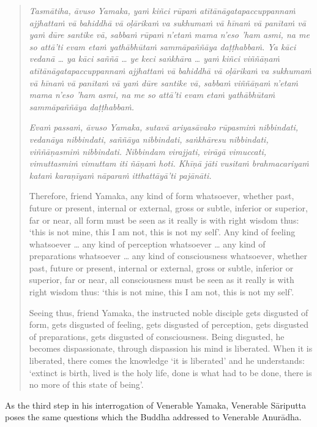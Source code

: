 \begin{quote}
\emph{Tasmātiha, āvuso Yamaka, yaṁ kiñci rūpaṁ atītānāgatapaccuppannaṁ ajjhattaṁ vā bahiddhā vā oḷārikaṁ va sukhumaṁ vā hīnaṁ vā panītaṁ vā yaṁ dūre santike vā, sabbaṁ rūpaṁ n'etaṁ mama n'eso 'ham asmi, na me so attā'ti evam etaṁ yathābhūtaṁ sammāpaññāya daṭṭhabbaṁ. Ya kāci vedanā \ldots{} ya kāci saññā \ldots{} ye keci saṅkhāra \ldots{} yaṁ kiñci viññāṇaṁ atītānāgatapaccuppannaṁ ajjhattaṁ vā bahiddhā vā oḷārikaṁ va sukhumaṁ vā hīnaṁ vā panītaṁ vā yaṁ dūre santike vā, sabbaṁ viññāṇaṁ n'etaṁ mama n'eso 'ham asmi, na me so attā'ti evam etaṁ yathābhūtaṁ sammāpaññāya daṭṭhabbaṁ.}

\emph{Evaṁ passaṁ, āvuso Yamaka, sutavā ariyasāvako rūpasmiṁ nibbindati, vedanāya nibbindati, saññāya nibbindati, saṅkhāresu nibbindati, viññāṇasmiṁ nibbindati. Nibbindam virajjati, virāgā vimuccati, vimuttasmiṁ vimuttam iti ñāṇaṁ hoti. Khīṇā jāti vusitaṁ brahmacariyaṁ kataṁ karaṇīyaṁ nāparaṁ itthattāyā'ti pajānāti.}

Therefore, friend Yamaka, any kind of form whatsoever, whether past, future or present, internal or external, gross or subtle, inferior or superior, far or near, all form must be seen as it really is with right wisdom thus: `this is not mine, this I am not, this is not my self'. Any kind of feeling whatsoever \ldots{} any kind of perception whatsoever \ldots{} any kind of preparations whatsoever \ldots{} any kind of consciousness whatsoever, whether past, future or present, internal or external, gross or subtle, inferior or superior, far or near, all consciousness must be seen as it really is with right wisdom thus: `this is not mine, this I am not, this is not my self'.

Seeing thus, friend Yamaka, the instructed noble disciple gets disgusted of form, gets disgusted of feeling, gets disgusted of perception, gets disgusted of preparations, gets disgusted of consciousness. Being disgusted, he becomes dispassionate, through dispassion his mind is liberated. When it is liberated, there comes the knowledge `it is liberated' and he understands: `extinct is birth, lived is the holy life, done is what had to be done, there is no more of this state of being'.
\end{quote}

As the third step in his interrogation of Venerable Yamaka, Venerable Sāriputta poses the same questions which the Buddha addressed to Venerable Anurādha.

